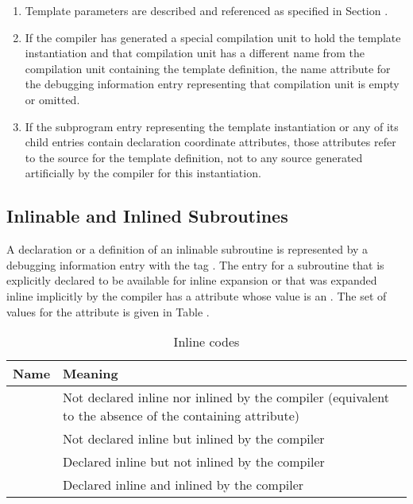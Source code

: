 \begin{enumerate}[1. ]
\item Template parameters are described and referenced as specified in
Section .

\item If the compiler has generated a special compilation unit
to hold the template instantiation and that compilation unit
has a different name from the compilation unit containing
the template definition, the name attribute for the debugging
information entry representing that compilation unit is empty
or omitted.

\item If the subprogram entry representing the template
instantiation or any of its child entries contain declaration
coordinate attributes, those attributes refer to the source
for the template definition, not to any source generated
artificially by the compiler for this instantiation.
\end{enumerate}


\subsection{Inlinable and Inlined Subroutines}
\label{chap:inlinedsubroutines}
A declaration or a definition of an inlinable subroutine
is represented by a debugging information entry with the
tag 
\DWTAGsubprogram.
The entry for a 
subroutine that is
\hypertarget{chap:DWATinlineinlinedsubroutine}{}
explicitly declared to be available for inline expansion or
that was expanded inline implicitly by the compiler has 
a
\DWATinlineDEFN{} attribute whose value is an 
. The
set of values for the \DWATinline{} attribute is given in
Table .

\begin{table}[h]
\centering
\caption{Inline codes}
\label{tab:inlinecodes}
\begin{tabular}{l|P{8cm}}
\hline
Name&Meaning\\ \hline
\DWINLnotinlinedTARG{} & Not declared inline nor inlined by the
  \mbox{compiler} (equivalent to the absence of the
  containing \DWATinline{} attribute) \\
\DWINLinlinedTARG{} & Not declared inline but inlined by the \mbox{compiler} \\
\DWINLdeclarednotinlinedTARG{} & Declared inline but 
  not inlined by the \mbox{compiler} \\
\DWINLdeclaredinlinedTARG{} & Declared inline and inlined by the 
  \mbox{compiler} \\
\hline
\end{tabular}
\end{table}

